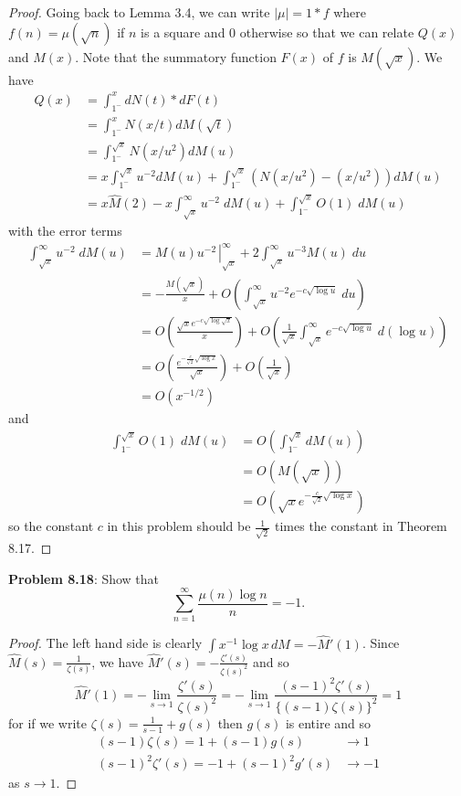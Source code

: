 \documentclass[12pt]{article}
\newcommand{\Mhat}{\widehat{M}}
\renewcommand{\O}[1]{O\left( #1 \right)}
\begin{document}
\begin{proof}
Going back to Lemma 3.4, we can write $|\mu| = 1 * f$ where $f(n) = \mu(\sqrt{n})$ if $n$ is a square and 0 otherwise so that we can relate $Q(x)$ and $M(x)$. Note that the summatory function $F(x)$ of $f$ is $M(\sqrt{x})$. We have
\begin{align*}
Q(x) &= \int_{1^-}^x dN(t) * dF(t)\\
&= \int_{1^-}^x N(x/t) dM(\sqrt{t})\\
&= \int_{1^-}^{\sqrt x} N(x/u^2) dM(u)\\
&= x \int_{1^-}^{\sqrt x} u^{-2} dM(u) + \int_{1^-}^{\sqrt x} (N(x/u^2) - (x/u^2)) dM(u)\\
&= x \Mhat(2) - x \int_{\sqrt x}^\infty u^{-2} \; dM(u) + \int_{1^-}^{\sqrt x} O(1) \; dM(u)
\end{align*}
with the error terms
\begin{align*}
\int_{\sqrt x}^\infty u^{-2} \; dM(u) &= \left. M(u) u^{-2} \frac{}{} \right|_{\sqrt x}^\infty + 2 \int_{\sqrt x}^\infty u^{-3} M(u) \; du\\
&= -\frac{M(\sqrt x)}{x} + \O{\int_{\sqrt x}^\infty u^{-2} e^{-c\sqrt{\log u}} \; du}\\
&= \O{\frac{\sqrt{x} e^{-c\sqrt{\log \sqrt{x}}}}{x}} + \O{\frac{1}{\sqrt x} \int_{\sqrt x}^\infty e^{-c\sqrt{\log u}} \; d(\log u)}\\
&= \O{\frac{e^{-\frac{c}{\sqrt{2}} \sqrt{\log x}}}{\sqrt x}} + \O{\frac{1}{\sqrt x}}\\
&= O(x^{-1/2})
\end{align*}
and
\begin{align*}
\int_{1^-}^{\sqrt x} O(1) \; dM(u) &= \O{\int_{1^-}^{\sqrt x} dM(u)} \\
&= \O{M(\sqrt{x})}\\
&= \O{\sqrt{x} e^{-\frac{c}{\sqrt{2}} \sqrt{\log x}}}
\end{align*}
so the constant $c$ in this problem should be $\frac{1}{\sqrt 2}$ times the constant in Theorem 8.17.
\end{proof}

\textbf{Problem 8.18}: Show that
$$\sum_{n=1}^{\infty} \frac{\mu(n) \log n}{n} = -1.$$

\begin{proof}
The left hand side is clearly $\int x^{-1} \log x \, dM = -\Mhat'(1)$. Since $\Mhat(s) = \frac{1}{\zeta(s)}$, we have $\Mhat'(s) = -\frac{\zeta'(s)}{\zeta(s)^2}$ and so
$$\Mhat'(1) = - \lim_{s \rightarrow 1} \frac{\zeta'(s)}{\zeta(s)^2} = - \lim_{s \rightarrow 1} \frac{(s - 1)^2 \zeta'(s)}{\{(s-1)\zeta(s)\}^2} = 1$$
for if we write $\zeta(s) = \frac{1}{s - 1} + g(s)$ then $g(s)$ is entire and so
\begin{align*}
(s - 1) \zeta(s) = 1 + (s-1) g(s) &\rightarrow 1\\
(s - 1)^2 \zeta'(s) = -1 + (s - 1)^2 g'(s) &\rightarrow -1
\end{align*}
as $s \rightarrow 1$.
\end{proof}
\end{document}
